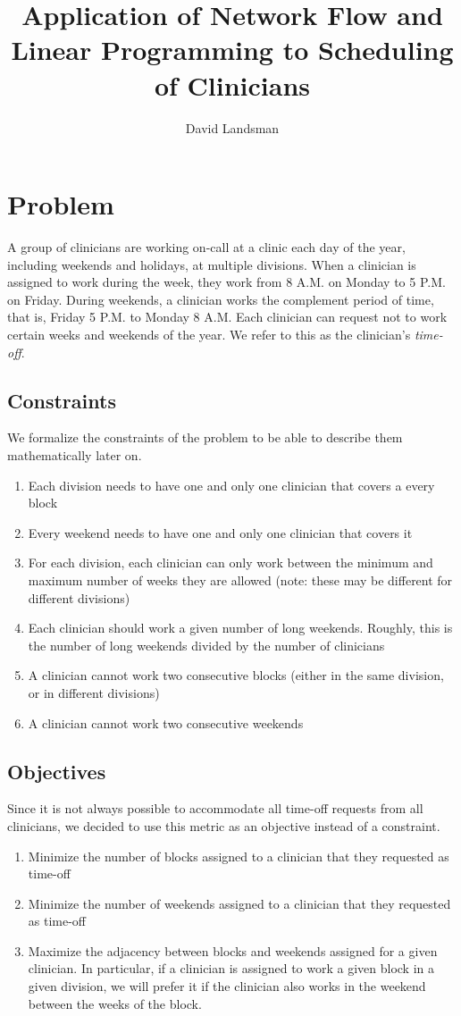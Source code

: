 \documentclass[]{article}
\title{Application of Network Flow and Linear Programming to Scheduling of Clinicians}
\author{David Landsman}
\begin{document}
\maketitle

\section{Problem} \label{problem}
A group of clinicians are working on-call at a clinic each day of the year, including weekends and holidays, at multiple divisions. When a clinician is assigned to work during the week, they work from 8 A.M. on Monday to 5 P.M. on Friday. During weekends, a clinician works the complement period of time, that is, Friday 5 P.M. to Monday 8 A.M. Each clinician can request not to work certain weeks and weekends of the year. We refer to this as the clinician's \textit{time-off}.

\subsection{Constraints} \label{constraints}
We formalize the constraints of the problem to be able to describe them mathematically later on.
	\begin{enumerate}
		\item Each division needs to have one and only one clinician that covers a every block
		\item Every weekend needs to have one and only one clinician that covers it
		\item For each division, each clinician can only work between the minimum and maximum number of weeks they are allowed (note: these may be different for different divisions)
		\item Each clinician should work a given number of long weekends. Roughly, this is the number of long weekends divided by the number of clinicians
		\item A clinician cannot work two consecutive blocks (either in the same division, or in different divisions)
		\item A clinician cannot work two consecutive weekends
	\end{enumerate}

\subsection{Objectives} \label{objectives}
Since it is not always possible to accommodate all time-off requests from all clinicians, we decided to use this metric as an objective instead of a constraint. 
	\begin{enumerate}
		\item Minimize the number of blocks assigned to a clinician that they requested as time-off
		\item Minimize the number of weekends assigned to a clinician that they requested as time-off
		\item Maximize the adjacency between blocks and weekends assigned for a given clinician. In particular, if a clinician is assigned to work a given block in a given division, we will prefer it if the clinician also works in the weekend between the weeks of the block.
	\end{enumerate}	
\end{document}
